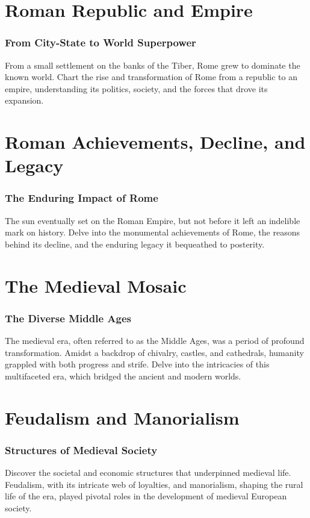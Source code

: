 \documentclass[a4paper,12pt]{book}
\begin{document}
\chapter{Roman Republic and Empire}
\subsection*{From City-State to World Superpower}
From a small settlement on the banks of the Tiber, Rome grew to dominate the known world. Chart the rise and transformation of Rome from a republic to an empire, understanding its politics, society, and the forces that drove its expansion.

\chapter{Roman Achievements, Decline, and Legacy}
\subsection*{The Enduring Impact of Rome}
The sun eventually set on the Roman Empire, but not before it left an indelible mark on history. Delve into the monumental achievements of Rome, the reasons behind its decline, and the enduring legacy it bequeathed to posterity.

\chapter{The Medieval Mosaic}
\subsection*{The Diverse Middle Ages}
The medieval era, often referred to as the Middle Ages, was a period of profound transformation. Amidst a backdrop of chivalry, castles, and cathedrals, humanity grappled with both progress and strife. Delve into the intricacies of this multifaceted era, which bridged the ancient and modern worlds.

\chapter{Feudalism and Manorialism}
\subsection*{Structures of Medieval Society}
Discover the societal and economic structures that underpinned medieval life. Feudalism, with its intricate web of loyalties, and manorialism, shaping the rural life of the era, played pivotal roles in the development of medieval European society.
\end{document}
